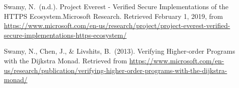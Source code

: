 \documentclass[12pt,twoside]{article}
\begin{document}
{\begin{thebibliography}{222}
\mdbibitemlabel{}Swamy, N.~(n.d.). Project Everest - Verified Secure Implementations of the HTTPS Ecosystem.Microsoft Research. Retrieved February 1, 2019, from \href{https://www.microsoft.com/en-us/research/project/project-everest-verified-secure-implementations-https-ecosystem/}{{\ttfamily https://\hspace{0pt}www.\hspace{0pt}microsoft.\hspace{0pt}com/\hspace{0pt}en-\hspace{0pt}us/\hspace{0pt}research/\hspace{0pt}project/\hspace{0pt}project-\hspace{0pt}everest-\hspace{0pt}verified-\hspace{0pt}secure-\hspace{0pt}implementations-\hspace{0pt}https-\hspace{0pt}ecosystem/\hspace{0pt}}}\label{swamy_project_nodate}%

\mdbibitemlabel{}Swamy, N., Chen, J., \& Livshits, B.~(2013). Verifying Higher-order Programs with the Dijkstra Monad. Retrieved from \href{https://www.microsoft.com/en-us/research/publication/verifying-higher-order-programs-with-the-dijkstra-monad/}{{\ttfamily https://\hspace{0pt}www.\hspace{0pt}microsoft.\hspace{0pt}com/\hspace{0pt}en-\hspace{0pt}us/\hspace{0pt}research/\hspace{0pt}publication/\hspace{0pt}verifying-\hspace{0pt}higher-\hspace{0pt}order-\hspace{0pt}programs-\hspace{0pt}with-\hspace{0pt}the-\hspace{0pt}dijkstra-\hspace{0pt}monad/\hspace{0pt}}}\label{swamy_verifying_2013}%


\end{thebibliography}}
\end{document}
